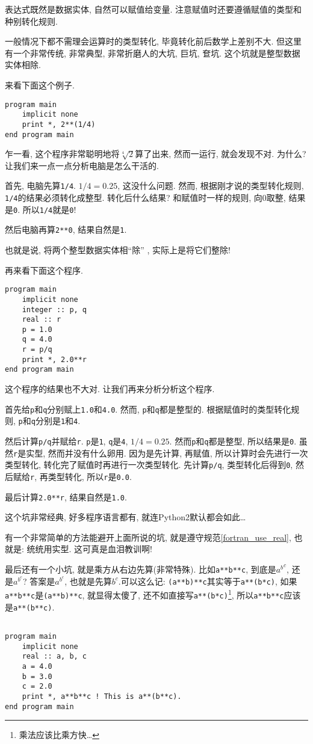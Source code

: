 表达式既然是数据实体, 自然可以赋值给变量. 注意赋值时还要遵循赋值的类型和种别转化规则.

一般情况下都不需理会运算时的类型转化, 毕竟转化前后数学上差别不大. 但这里有一个非常传统, 非常典型, 非常折磨人的大坑, 巨坑, 奆坑. 这个坑就是整型数据实体相除.

来看下面这个例子.
\begin{lstlisting}
program main
    implicit none
    print *, 2**(1/4)
end program main
\end{lstlisting}

乍一看, 这个程序非常聪明地将$\sqrt[4]{2}$算了出来, 然而一运行, 就会发现不对. 为什么? 让我们来一点一点分析电脑是怎么干活的.

首先, 电脑先算\texttt{1/4}. $1/4=0.25$, 这没什么问题. 然而, 根据刚才说的类型转化规则, \texttt{1/4}的结果必须转化成整型. 转化后什么结果? 和赋值时一样的规则, 向0取整, 结果是\texttt{0}. 所以\texttt{1/4}就是\texttt{0}!

然后电脑再算\texttt{2**0}, 结果自然是\texttt{1}.

也就是说, 将两个整型数据实体相``除'' , 实际上是将它们整除!

再来看下面这个程序.

\begin{lstlisting}
program main
    implicit none
    integer :: p, q
    real :: r
    p = 1.0
    q = 4.0
    r = p/q
    print *, 2.0**r
end program main
\end{lstlisting}
这个程序的结果也不大对. 让我们再来分析分析这个程序.

首先给\texttt{p}和\texttt{q}分别赋上\texttt{1.0}和\texttt{4.0}. 然而, \texttt{p}和\texttt{q}都是整型的. 根据赋值时的类型转化规则, \texttt{p}和\texttt{q}分别是\texttt{1}和\texttt{4}.

然后计算\texttt{p/q}并赋给\texttt{r}. \texttt{p}是\texttt{1}, \texttt{q}是\texttt{4}, $1/4=0.25$. 然而\texttt{p}和\texttt{q}都是整型, 所以结果是\texttt{0}. 虽然\texttt{r}是实型, 然而并没有什么卵用. 因为是先计算, 再赋值, 所以计算时会先进行一次类型转化, 转化完了赋值时再进行一次类型转化. 先计算\texttt{p/q}, 类型转化后得到\texttt{0}, 然后赋给\texttt{r}, 再类型转化, 所以\texttt{r}是\texttt{0.0}.

最后计算\texttt{2.0**r}, 结果自然是\texttt{1.0}.

这个坑非常经典, 好多程序语言都有, 就连Python2默认都会如此\dots

有一个非常简单的方法能避开上面所说的坑, 就是遵守规范\ref{fortran_use_real}, 也就是: 统统用实型. 这可真是血泪教训啊!

最后还有一个小坑, 就是乘方从右边先算(非常特殊). 比如\texttt{a**b**c}, 到底是${a^b}^c$, 还是$a^{b^c}$? 答案是$a^{b^c}$, 也就是先算$b^c$.可以这么记: \texttt{(a**b)**c}其实等于\texttt{a**(b*c)}, 如果\texttt{a**b**c}是\texttt{(a**b)**c}, 就显得太傻了, 还不如直接写\texttt{a**(b*c)}\footnote{
    乘法应该比乘方快\dots
}, 所以\texttt{a**b**c}应该是\texttt{a**(b**c)}.
\begin{lstlisting}

program main
    implicit none
    real :: a, b, c
    a = 4.0
    b = 3.0
    c = 2.0
    print *, a**b**c ! This is a**(b**c).
end program main
\end{lstlisting}

